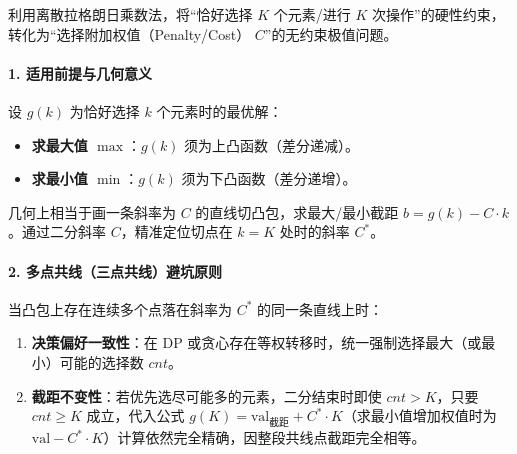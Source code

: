 \noindent
利用离散拉格朗日乘数法，将“恰好选择 $K$ 个元素/进行 $K$ 次操作”的硬性约束，转化为“选择附加权值（Penalty/Cost） $C$”的无约束极值问题。

\paragraph{1. 适用前提与几何意义}
设 $g(k)$ 为恰好选择 $k$ 个元素时的最优解：
\begin{itemize}
    \item \textbf{求最大值 $\max$}：$g(k)$ 须为上凸函数（差分递减）。
    \item \textbf{求最小值 $\min$}：$g(k)$ 须为下凸函数（差分递增）。
\end{itemize}
几何上相当于画一条斜率为 $C$ 的直线切凸包，求最大/最小截距 $b = g(k) - C \cdot k$。通过二分斜率 $C$，精准定位切点在 $k = K$ 处时的斜率 $C^*$。

\paragraph{2. 多点共线（三点共线）避坑原则}
当凸包上存在连续多个点落在斜率为 $C^*$ 的同一条直线上时：
\begin{enumerate}
    \item \textbf{决策偏好一致性}：在 DP 或贪心存在等权转移时，统一强制选择最大（或最小）可能的选择数 $cnt$。
    \item \textbf{截距不变性}：若优先选尽可能多的元素，二分结束时即使 $cnt > K$，只要 $cnt \ge K$ 成立，代入公式 $g(K) = \mathrm{val}_{\text{截距}} + C^* \cdot K$（求最小值增加权值时为 $\mathrm{val} - C^* \cdot K$）计算依然完全精确，因整段共线点截距完全相等。
\end{enumerate}